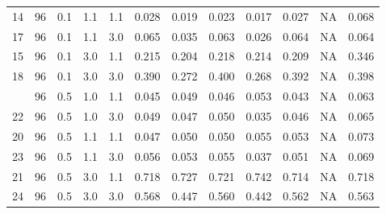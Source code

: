 \begin{longtable}[t]{cccccrrrrrrc}
14 & 96 & 0.1 & 1.1 & 1.1 & 0.028 & 0.019 & 0.023 & 0.017 & 0.027 & NA & 0.068\\
17 & 96 & 0.1 & 1.1 & 3.0 & 0.065 & 0.035 & 0.063 & 0.026 & 0.064 & NA & 0.064\\
15 & 96 & 0.1 & 3.0 & 1.1 & 0.215 & 0.204 & 0.218 & 0.214 & 0.209 & NA & 0.346\\
18 & 96 & 0.1 & 3.0 & 3.0 & 0.390 & 0.272 & 0.400 & 0.268 & 0.392 & NA & 0.398\\
\addlinespace
19 & 96 & 0.5 & 1.0 & 1.1 & 0.045 & 0.049 & 0.046 & 0.053 & 0.043 & NA & 0.063\\
22 & 96 & 0.5 & 1.0 & 3.0 & 0.049 & 0.047 & 0.050 & 0.035 & 0.046 & NA & 0.065\\
20 & 96 & 0.5 & 1.1 & 1.1 & 0.047 & 0.050 & 0.050 & 0.055 & 0.053 & NA & 0.073\\
23 & 96 & 0.5 & 1.1 & 3.0 & 0.056 & 0.053 & 0.055 & 0.037 & 0.051 & NA & 0.069\\
21 & 96 & 0.5 & 3.0 & 1.1 & 0.718 & 0.727 & 0.721 & 0.742 & 0.714 & NA & 0.718\\
24 & 96 & 0.5 & 3.0 & 3.0 & 0.568 & 0.447 & 0.560 & 0.442 & 0.562 & NA & 0.563\\
\bottomrule
\end{longtable}
\endgroup{}

